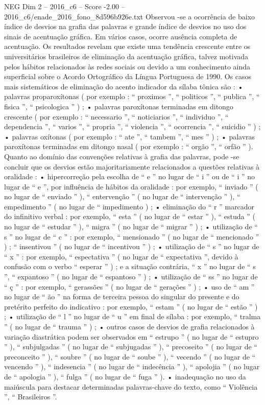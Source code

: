 \begin{textsample}{NEG Dim 2 – 2016\_c6 – Score -2.00 – 2016\_c6/enade\_2016\_fono\_8d596b926e.txt}
Observou -se a ocorrência de baixo índice de desvios na grafia das palavras e grande índice de desvios no uso dos sinais de acentuação gráfica.
Em vários casos, ocorre ausência completa de acentuação.
Os resultados revelam que existe uma tendência crescente entre os universitários brasileiros de eliminação da acentuação gráfica, talvez motivada pelos hábitos relacionados às redes sociais ou devido a um conhecimento ainda superficial sobre o Acordo Ortográfico da Língua Portuguesa de 1990.
Os casos mais sistemáticos de eliminação do acento indicador da sílaba tônica são : • palavras proparoxítonas ( por exemplo : “ proximos ”, “ politicos ”, “ publica ”, “ fisica ”, “ psicologica ” ) ; • palavras paroxítonas terminadas em ditongo crescente ( por exemplo : “ necessario ”, “ noticiarios ”, “ individuo ”, “ dependencia ”, “ varios ”, “ propria ”, “ violencia ”, “ ocorrencia ”, “ suicidio ” ) ; • palavras oxítonas ( por exemplo : “ ate ”, “ tambem ”, “ mes ” ) ; • palavras paroxítonas terminadas em ditongo nasal ( por exemplo : “ orgão ”, “ orfão ” ).
Quanto ao domínio das convenções relativas à grafia das palavras, pode -se concluir que os desvios estão majoritariamente relacionados a questões relativas à oralidade : • hipercorreção pela escolha de “ e ” no lugar de “ i ” ou de “ i ” no lugar de “ e ”, por influência de hábitos da oralidade : por exemplo, “ inviado ” ( no lugar de “ enviado ” ), “ entervenção ” ( no lugar de “ intervenção ” ), “ empedimento ” ( no lugar de “ impedimento ) ; • eliminação do “ r ” marcador do infinitivo verbal : por exemplo, “ esta ” ( no lugar de “ estar ” ), “ estuda ” ( no lugar de “ estudar ” ), “ migra ” ( no lugar de “ migrar ” ) ; • utilização de “ s ” no lugar de “ c ” : por exemplo, “ mensionado ” ( no lugar de “ mencionado ” ) ; “ insentivou ” ( no lugar de “ incentivou ” ) ; • utilização de “ s ” no lugar de “ x ” : por exemplo, “ espectativa ” ( no lugar de “ expectativa ”, devido à confusão com o verbo “ esperar ” ) ; e a situação contrária, “ x ” no lugar de “ s ”, “ expantoso ” ( no lugar de “ espantoso ” ) ; • utilização de “ ss ” no lugar de “ ç ” : por exemplo, “ gerassões ” ( no lugar de “ gerações ” ) ; • uso de “ am ” no lugar de “ ão ” na forma de terceira pessoa do singular do presente e do pretérito perfeito do indicativo : por exemplo, “ estam ” ( no lugar de “ estão ” ) ; • utilização de “ l ” no lugar de “ u ” em final de sílaba : por exemplo, “ tralma ” ( no lugar de “ trauma ” ) ; • outros casos de desvios de grafia relacionados à variação diastrática podem ser observados em “ estrupo ” ( no lugar de “ estupro ” ), “ subjulgadas ” ( no lugar de “ subjugadas ” ), “ precoseito ” ( no lugar de “ preconceito ” ), “ soubre ” ( no lugar de “ soube ” ), “ vecendo ” ( no lugar de “ vencendo ” ), “ indesencia ” ( no lugar de “ indecência ” ), “ apolojia ” ( no lugar de “ apologia ” ), “ fulga ” ( no lugar de “ fuga ” ). • inadequação no uso da maiúscula para destacar determinadas palavras-chave do texto, como “ Violência ”, “ Brasileiros ”.

\end{textsample}
